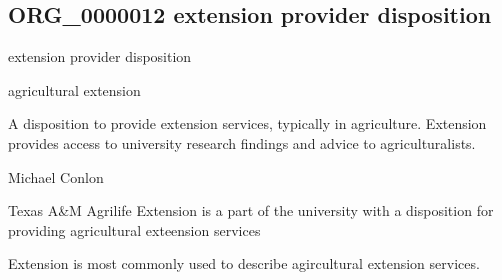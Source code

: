\documentclass[letterpaper,10pt,english]{sphinxmanual}
\begin{document}
\subsection{ORG\_0000012 \sphinxhyphen{} extension provider disposition}
\label{\detokenize{doc-ORG_0000012:org-0000012-extension-provider-disposition}}\label{\detokenize{doc-ORG_0000012:index-0}}\label{\detokenize{doc-ORG_0000012::doc}}
\begin{sphinxShadowBox}

\sphinxAtStartPar
extension provider disposition
\end{sphinxShadowBox}

\begin{sphinxShadowBox}

\sphinxAtStartPar
agricultural extension
\end{sphinxShadowBox}

\begin{sphinxShadowBox}

\sphinxAtStartPar
{\hyperref[\detokenize{doc-BFO_0000016::doc}]{}}
\end{sphinxShadowBox}

\begin{sphinxShadowBox}

\sphinxAtStartPar
A disposition to provide extension services, typically in agriculture.  Extension provides access to university research findings and advice to agriculturalists.
\end{sphinxShadowBox}

\begin{sphinxShadowBox}

\sphinxAtStartPar
Michael Conlon 
\end{sphinxShadowBox}

\begin{sphinxShadowBox}

\sphinxAtStartPar
Texas A\&M Agrilife Extension is a part of the university with a disposition for providing agricultural exteension services
\end{sphinxShadowBox}

\begin{sphinxShadowBox}

\sphinxAtStartPar
Extension is most commonly used to describe agircultural extension services.
\end{sphinxShadowBox}
\end{document}
